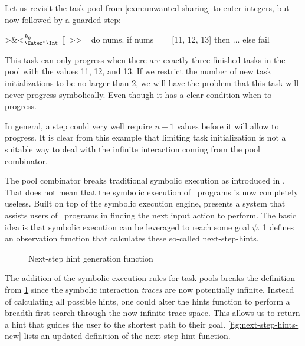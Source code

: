 \begin{example}
  Let us revisit the task pool from \cref{exm:unwanted-sharing} to enter integers,
  but now followed by a guarded step:
  \begin{TASK}[emph={nums}]
    >&<$^{k_0}_{\Enter^\epsilon\Int}$ [] >>= do nums.
    if nums == [11, 12, 13] then ... else fail
  \end{TASK}
  This task can only progress when there are exactly three finished tasks in the pool with the values 11, 12, and 13.
  If we restrict the number of new task initializations to be no larger than 2,
  we will have the problem that this task will never progress symbolically.
  Even though it has a clear condition when to progress.
\end{example}
In general, a step could very well require $n+1$ values before it will allow to progress.
It is clear from this example that limiting task initialization is not a suitable way to deal with the infinite interaction coming from the pool combinator.

The pool combinator breaks traditional symbolic execution as introduced in \citet{conf/ifl/NausSK19}.
That does not mean that the symbolic execution of \DYNTOPHAT\ programs is now completely useless.
Built on top of the symbolic execution engine, \citet{conf/sfp/NausS20} presents a system that assists users of \TOPHAT\ programs in finding the next input action to perform.
The basic idea is that symbolic execution can be leveraged to reach some goal $\psi$.
\cref{fig:next-step-hints} defines an observation function that calculates these so-called next-step-hints.

\begin{figure}
  \begin{mathpar}
  \end{mathpar}
  \caption{Next-step hint generation function}
  \label{fig:next-step-hints}
\end{figure}

The addition of the symbolic execution rules for task pools breaks the definition from \cref{fig:next-step-hints}
since the symbolic interaction \textit{traces} are now potentially infinite.
Instead of calculating all possible hints,
one could alter the hints function to perform a breadth-first search through the now infinite trace space.
This allows us to return a hint that guides the user to the shortest path to their goal.
\cref{fig:next-step-hints-new} lists an updated definition of the next-step hint function.

